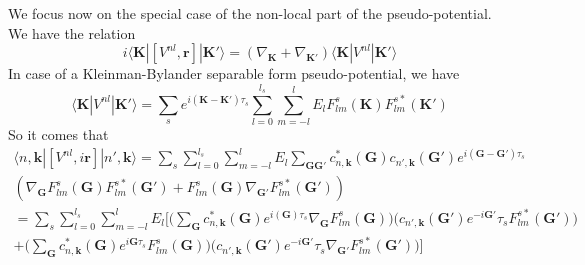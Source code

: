 \documentclass[a4paper,11pt]{report}
\renewcommand{\vec}[1]{\mathbf{#1}}
\newcommand{\bra}{\langle}
\newcommand{\ket}{\rangle}
\begin{document}
We focus now on the special case of the non-local part of the pseudo-potential.\\
We have the relation
\begin{equation}
 i\bra \vec{K}|[V^{nl},\vec{r}]|\vec{K'}\ket=(\nabla_{\vec{K}}+\nabla_{\vec{K'}})\bra \vec{K}|V^{nl}|\vec{K'}\ket
\end{equation}
In case of a Kleinman-Bylander separable form pseudo-potential, we have
\begin{equation}
 \bra \vec{K}|V^{nl}|\vec{K'}\ket = \sum_s e^{i(\vec{K}-\vec{K'})\tau_s} \sum_{l=0}^{l_s}\sum_{m=-l}^{l}E_lF_{lm}^s(\vec{K})F_{lm}^{s*}(\vec{K'})
\end{equation}
So it comes that
\begin{eqnarray}
  \bra n,\vec{k}|[V^{nl},i\vec{r}]|n',\vec{k}\ket = \sum_s \sum_{l=0}^{l_s}\sum_{m=-l}^{l}E_l \sum_{\vec{G}\vec{G'}} c^*_{n,\vec{k}}(\vec{G})c_{n',\vec{k}}(\vec{G'}) e^{i(\vec{G}-\vec{G'})\tau_s} \nonumber\\
( \nabla_{\vec{G}}F_{lm}^s(\vec{G})F_{lm}^{s*}(\vec{G'}) + F_{lm}^s(\vec{G})\nabla_{\vec{G'}}F_{lm}^{s*}(\vec{G'}) ) \nonumber\\
= \sum_s \sum_{l=0}^{l_s}\sum_{m=-l}^{l}E_l \Bigg[ \Bigg(\sum_{\vec{G}}c^*_{n,\vec{k}}(\vec{G})e^{i(\vec{G})\tau_s}\nabla_{\vec{G}}F_{lm}^s(\vec{G})\Bigg)\Bigg(c_{n',\vec{k}}(\vec{G'}) e^{-i\vec{G'}}\tau_sF_{lm}^{s*}(\vec{G'})\Bigg) \nonumber\\
+  \Bigg(\sum_{\vec{G}}c^*_{n,\vec{k}}(\vec{G})e^{i\vec{G}\tau_s}F_{lm}^s(\vec{G})\Bigg)\Bigg(c_{n',\vec{k}}(\vec{G'}) e^{-i\vec{G'}}\tau_s\nabla_{\vec{G'}}F_{lm}^{s*}(\vec{G'})\Bigg) \Bigg]
\end{eqnarray}
\end{document}
